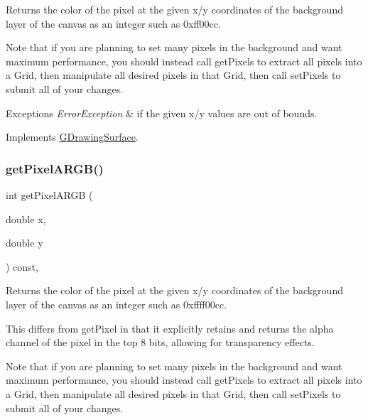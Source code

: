 Returns the color of the pixel at the given x/y coordinates of the background layer of the canvas as an integer such as 0xff00cc. 

Note that if you are planning to set many pixels in the background and want maximum performance, you should instead call get\+Pixels to extract all pixels into a Grid, then manipulate all desired pixels in that Grid, then call set\+Pixels to submit all of your changes.


\begin{DoxyExceptions}{Exceptions}
{\em Error\+Exception} & if the given x/y values are out of bounds. \\
\hline
\end{DoxyExceptions}


Implements \mbox{\hyperlink{classGDrawingSurface_a40f3e3f64a8263e13b7162e15b2979ee}{G\+Drawing\+Surface}}.

\mbox{\label{classGCanvas_ae28117ec01d58208d381fba886030850}} 
\subsubsection{\texorpdfstring{get\+Pixel\+A\+R\+G\+B()}{getPixelARGB()}}
{\footnotesize\ttfamily int get\+Pixel\+A\+R\+GB (\begin{DoxyParamCaption}\item[{double}]{x,  }\item[{double}]{y }\end{DoxyParamCaption}) const\hspace{0.3cm}{\ttfamily [override]}, {\ttfamily [virtual]}}



Returns the color of the pixel at the given x/y coordinates of the background layer of the canvas as an integer such as 0xffff00cc. 

This differs from get\+Pixel in that it explicitly retains and returns the alpha channel of the pixel in the top 8 bits, allowing for transparency effects.

Note that if you are planning to set many pixels in the background and want maximum performance, you should instead call get\+Pixels to extract all pixels into a Grid, then manipulate all desired pixels in that Grid, then call set\+Pixels to submit all of your changes.


